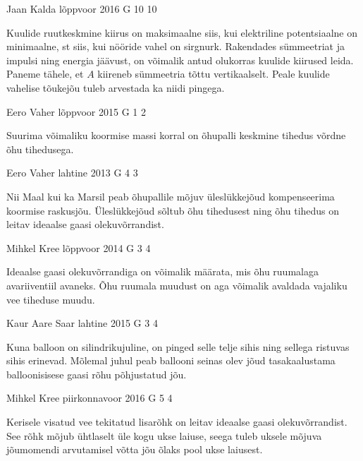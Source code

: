 \documentclass[11pt, twoside]{article}
\begin{document}
{%
{Jaan Kalda} %
{lõppvoor} %
{2016} %
{G 10} %
{10} %
{

\ifHint
\osa Kuulide ruutkeskmine kiirus on maksimaalne siis, kui elektriline potentsiaalne on minimaalne, st siis, kui nööride vahel on sirgnurk. Rakendades sümmeetriat ja impulsi ning energia jäävust, on võimalik antud olukorras kuulide kiirused leida.\\
\osa Paneme tähele, et $A$ kiireneb sümmeetria tõttu vertikaalselt. Peale kuulide vahelise tõukejõu tuleb arvestada ka niidi pingega.
\fi
}

{Eero Vaher} %
{lõppvoor} %
{2015} %
{G 1} %
{2} %
{

\ifHint
Suurima võimaliku koormise massi korral on õhupalli keskmine tihedus võrdne õhu tihedusega.
\fi
}

{Eero Vaher} %
{lahtine} %
{2013} %
{G 4} %
{3} %
{

\ifHint
Nii Maal kui ka Marsil peab õhupallile mõjuv üleslükkejõud kompenseerima koormise raskusjõu. Üleslükkejõud sõltub õhu tihedusest ning õhu tihedus on leitav ideaalse gaasi olekuvõrrandist.
\fi
}

{Mihkel Kree} %
{lõppvoor} %
{2014} %
{G 3} %
{4} %
{

\ifHint
Ideaalse gaasi olekuvõrrandiga on võimalik määrata, mis õhu ruumalaga avariiventiil avaneks. Õhu ruumala muudust on aga võimalik avaldada vajaliku vee tiheduse muudu.
\fi
}

{Kaur Aare Saar} %
{lahtine} %
{2015} %
{G 3} %
{4} %
{

\ifHint
Kuna balloon on silindrikujuline, on pinged selle telje sihis ning sellega ristuvas sihis erinevad. Mõlemal juhul peab ballooni seinas olev jõud tasakaalustama balloonisisese gaasi rõhu põhjustatud jõu.
\fi
}

{Mihkel Kree} %
{piirkonnavoor} %
{2016} %
{G 5} %
{4} %
{

\ifHint
Kerisele visatud vee tekitatud lisarõhk on leitav ideaalse gaasi olekuvõrrandist. See rõhk mõjub ühtlaselt üle kogu ukse laiuse, seega tuleb uksele mõjuva jõumomendi arvutamisel võtta jõu õlaks pool ukse laiusest.
\fi
}

}
\end{document}
